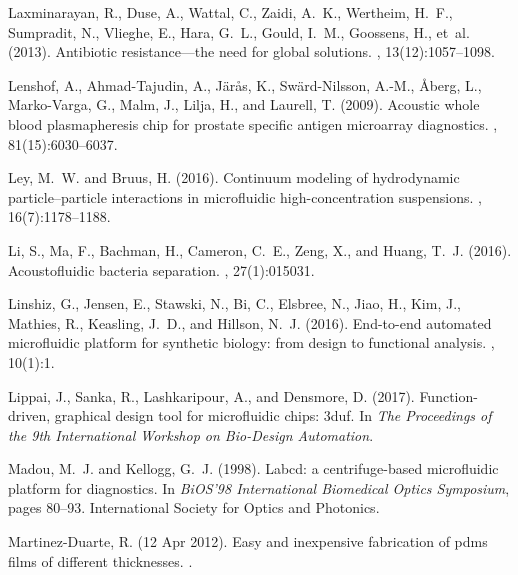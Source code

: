 \documentclass[12pt,letterpaper]{report}          %
\begin{document}
\begin{thebibliography}{}
Laxminarayan, R., Duse, A., Wattal, C., Zaidi, A.~K., Wertheim, H.~F.,
  Sumpradit, N., Vlieghe, E., Hara, G.~L., Gould, I.~M., Goossens, H., et~al.
  (2013).
\newblock Antibiotic resistance—the need for global solutions.
, 13(12):1057--1098.

Lenshof, A., Ahmad-Tajudin, A., Jär{\aa}s, K., Swärd-Nilsson, A.-M.,
  {\AA}berg, L., Marko-Varga, G., Malm, J., Lilja, H., and Laurell, T. (2009).
\newblock Acoustic whole blood plasmapheresis chip for prostate specific
  antigen microarray diagnostics.
, 81(15):6030--6037.

Ley, M.~W. and Bruus, H. (2016).
\newblock Continuum modeling of hydrodynamic particle--particle interactions in
  microfluidic high-concentration suspensions.
, 16(7):1178--1188.

Li, S., Ma, F., Bachman, H., Cameron, C.~E., Zeng, X., and Huang, T.~J. (2016).
\newblock Acoustofluidic bacteria separation.
, 27(1):015031.

Linshiz, G., Jensen, E., Stawski, N., Bi, C., Elsbree, N., Jiao, H., Kim, J.,
  Mathies, R., Keasling, J.~D., and Hillson, N.~J. (2016).
\newblock End-to-end automated microfluidic platform for synthetic biology:
  from design to functional analysis.
, 10(1):1.

Lippai, J., Sanka, R., Lashkaripour, A., and Densmore, D. (2017).
\newblock Function-driven, graphical design tool for microfluidic chips: 3duf.
\newblock In {\em The Proceedings of the 9th International Workshop on
  Bio-Design Automation}.

Madou, M.~J. and Kellogg, G.~J. (1998).
\newblock Labcd: a centrifuge-based microfluidic platform for diagnostics.
\newblock In {\em BiOS'98 International Biomedical Optics Symposium}, pages
  80--93. International Society for Optics and Photonics.

Martinez-Duarte, R. (12 Apr 2012).
\newblock Easy and inexpensive fabrication of pdms films of different
  thicknesses.
.


\end{thebibliography}
\end{document}
